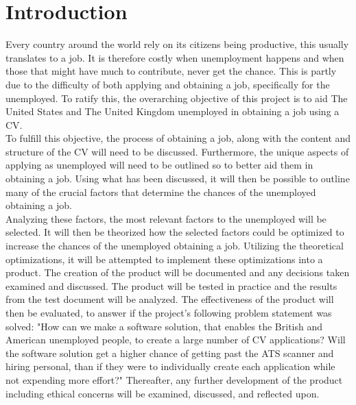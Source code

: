 \section{Introduction}\label{sec:introduction}
Every country around the world rely on its citizens being productive, this usually translates to a job. 
It is therefore costly when unemployment happens and when those that might have much to contribute, never get the chance. 
This is partly due to the difficulty of both applying and obtaining a job, specifically for the unemployed. 
To ratify this, the overarching objective of this project is to aid The United States and The United Kingdom unemployed in obtaining a job using a CV. \\

To fulfill this objective, the process of obtaining a job, along with the content and structure of the CV will need to be discussed.
Furthermore, the unique aspects of applying as unemployed will need to be outlined so to better aid them in obtaining a job.
Using what has been discussed, it will then be possible to outline many of the crucial factors that determine the chances of the unemployed obtaining a job. \\

Analyzing these factors, the most relevant factors to the unemployed will be selected.
It will then be theorized how the selected factors could be optimized to increase the chances of the unemployed obtaining a job. 
Utilizing the theoretical optimizations, it will be attempted to implement these optimizations into a product.
The creation of the product will be documented and any decisions taken examined and discussed. 
The product will be tested in practice and the results from the test document will be analyzed.
The effectiveness of the product will then be evaluated, to answer if the project's following problem statement was solved: "How can we make a software solution, that enables the British and American unemployed people, 
to create a large number of CV applications?
Will the software solution get a higher chance of getting past the ATS scanner and hiring personal, than
if they were to individually create each application while not expending more effort?"
Thereafter, any further development of the product including ethical concerns will be examined, discussed, and reflected upon. \\

\newpage

